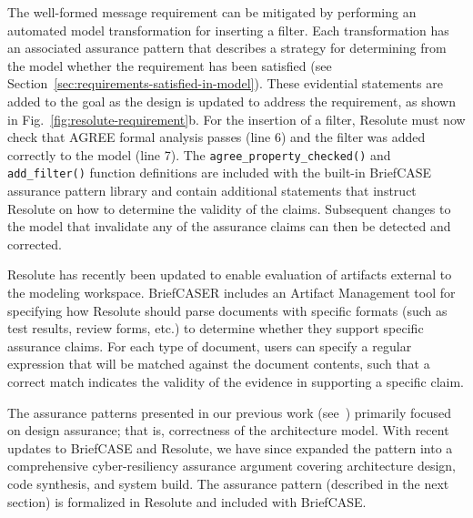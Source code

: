 The well-formed message requirement can be mitigated by performing an automated model transformation for inserting a filter. Each transformation has an associated assurance pattern that describes a strategy for determining from the model whether the requirement has been satisfied (see Section~\ref{sec:requirements-satisfied-in-model}).  
These evidential statements are added to the goal as the design is updated to address the requirement, as shown in Fig.~\ref{fig:resolute-requirement}b.  For the insertion of a filter, Resolute must now check that AGREE formal analysis passes (line 6) and the filter was added correctly to the model (line 7).  The \texttt{agree\_property\_checked()} and \texttt{add\_filter()} function definitions are included with the built-in BriefCASE assurance pattern library and contain additional statements that instruct Resolute on how to determine the validity of the claims. 
Subsequent changes to the model that invalidate any of the assurance claims can then be detected and corrected.  

Resolute has recently been updated to enable evaluation of artifacts external to the modeling workspace. BriefCASER includes an Artifact Management tool for specifying how Resolute should parse documents with specific formats (such as test results, review forms, etc.) to determine whether they support specific assurance claims.  For each type of document, users can specify a regular expression that will be matched against the document contents, such that a correct match indicates the validity of the evidence in supporting a specific claim.

The assurance patterns presented in our previous work (see~\cite{resolute-destion}) primarily focused on design assurance; that is, correctness of the architecture model.  With recent updates to BriefCASE and Resolute, we have since expanded the pattern into a comprehensive cyber-resiliency assurance argument covering architecture design, code synthesis, and system build.  The assurance pattern (described in the next section) is formalized in Resolute and included with BriefCASE.
